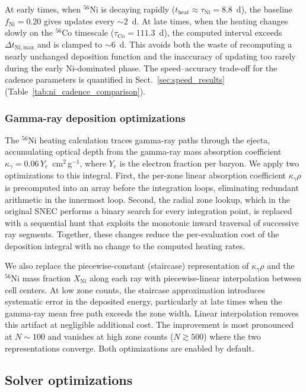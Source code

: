\documentclass[twocolumn,linenumbers]{aastex701}
\begin{document}
At early times, when $^{56}$Ni is decaying rapidly ($t_{\mathrm{heat}} \approx \tau_{\mathrm{Ni}} = 8.8$~d), the baseline $f_{\mathrm{Ni}} = 0.20$ gives updates every ${\sim}2$~d. At late times, when the heating changes slowly on the $^{56}$Co timescale ($\tau_{\mathrm{Co}} = 111.3$~d), the computed interval exceeds $\Delta t_{\mathrm{Ni,max}}$ and is clamped to ${\sim}6$~d. This avoids both the waste of recomputing a nearly unchanged deposition function and the inaccuracy of updating too rarely during the early Ni-dominated phase. The speed--accuracy trade-off for the cadence parameters is quantified in Sect.~\ref{sec:speed_results} (Table~\ref{tab:ni_cadence_comparison}).

\subsubsection{Gamma-ray deposition optimizations}
\label{sec:ni_ray_interp}

The $^{56}$Ni heating calculation traces gamma-ray paths through the ejecta, accumulating optical depth from the gamma-ray mass absorption coefficient $\kappa_\gamma = 0.06\,Y_e$~cm$^{2}$\,g$^{-1}$, where $Y_e$ is the electron fraction per baryon. We apply two optimizations to this integral. First, the per-zone linear absorption coefficient $\kappa_\gamma \rho$ is precomputed into an array before the integration loops, eliminating redundant arithmetic in the innermost loop. Second, the radial zone lookup, which in the original SNEC performs a binary search for every integration point, is replaced with a sequential hunt that exploits the monotonic inward traversal of successive ray segments. Together, these changes reduce the per-evaluation cost of the deposition integral with no change to the computed heating rates.

We also replace the piecewise-constant (staircase) representation of $\kappa_\gamma \rho$ and the $^{56}$Ni mass fraction $X_\mathrm{Ni}$ along each ray with piecewise-linear interpolation between cell centers. At low zone counts, the staircase approximation introduces systematic error in the deposited energy, particularly at late times when the gamma-ray mean free path exceeds the zone width. Linear interpolation removes this artifact at negligible additional cost. The improvement is most pronounced at $N \sim 100$ and vanishes at high zone counts ($N \gtrsim 500$) where the two representations converge. Both optimizations are enabled by default.

\subsection{Solver optimizations}
\label{sec:solver}
\end{document}
